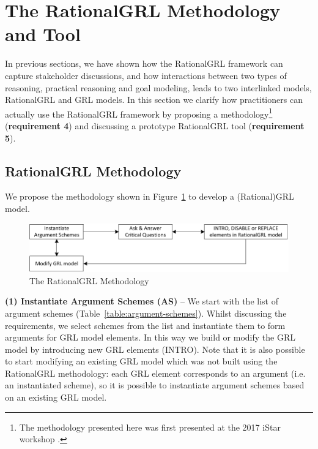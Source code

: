 \section{The RationalGRL Methodology and Tool}
\label{sect:methodology}

In previous sections, we have shown how the RationalGRL framework can capture stakeholder discussions, and how interactions between two types of reasoning, practical reasoning and goal modeling, leads to two interlinked models, RationalGRL and GRL models. In this section we clarify how practitioners can actually use the RationalGRL framework by proposing a methodology\footnote{The methodology presented here was first presented at the 2017 iStar workshop \cite{ghanavatiMethodology}.} (\textbf{requirement 4}) and discussing a prototype RationalGRL tool (\textbf{requirement 5}).

\subsection{RationalGRL Methodology}
\label{sect:methodology} 

We propose the methodology shown in Figure~\ref{fig:rationalgrl-methodology} to develop a (Rational)GRL model. %

\begin{figure}[ht]
\centering
\includegraphics{img/methodology.pdf}
\caption{The RationalGRL Methodology}
\label{fig:rationalgrl-methodology}
\end{figure}

\textbf{(1) Instantiate Argument Schemes (AS)} -- We start with the list of argument schemes (Table~\ref{table:argument-schemes}). Whilst discussing the requirements, we select schemes from the list and instantiate them to form arguments for GRL model elements. In this way we build or modify the GRL model by introducing new GRL elements (\textsf{INTRO}). Note that it is also possible to start modifying an existing GRL model which was not built using the RationalGRL methodology: each GRL element corresponds to an argument (i.e. an instantiated scheme), so it is possible to instantiate argument schemes based on an existing GRL model. 

